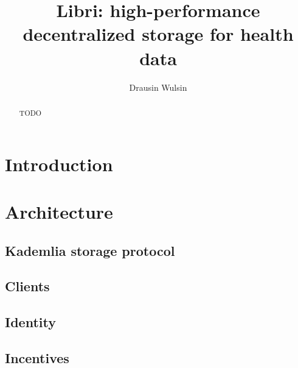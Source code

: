 \documentclass[10pt]{article}
\begin{document}
\title{Libri: high-performance decentralized storage for health data}
\author{Drausin Wulsin}
\maketitle

\begin{abstract}
TODO
\end{abstract}

\section{Introduction}

\section{Architecture}

\subsection{Kademlia storage protocol}

\subsection{Clients}

\subsection{Identity}

\subsection{Incentives}
\end{document}
